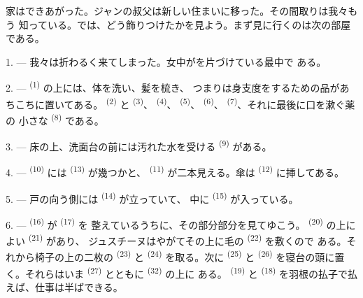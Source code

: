 %

\VUsaut{6.0mm}
\VUsaut{1.4mm}
\VUsaut{0.4mm}
\VUsaut{2.2mm}

家はできあがった。ジャンの叔父は新しい住まいに移った。その間取りは我々もう
知っている。では、どう飾りつけたかを見よう。まず見に行くのは次の部屋である。

\VUsaut{3.0mm}

1. --- 我々は折わるく来てしまった。女中がを片づけている最中で
ある。

2. ---  \textsuperscript{(1)} の上には、体を洗い、髪を梳き、
つまりは身支度をするための品があちこちに置いてある。
\textsuperscript{(2)} と \textsuperscript{(3)}、
\textsuperscript{(4)}、 \textsuperscript{(5)}、
\textsuperscript{(6)}、 \textsuperscript{(7)}、それに最後に口を漱ぐ薬の
小さな \textsuperscript{(8)} である。

3. --- 床の上、洗面台の前には汚れた水を受ける \textsuperscript{(9)}
がある。

4. ---  \textsuperscript{(10)} には \textsuperscript{(13)}
が幾つかと、 \textsuperscript{(11)} が二本見える。傘は
\textsuperscript{(12)} に挿してある。

5. --- 戸の向う側には \textsuperscript{(14)} が立っていて、
中に \textsuperscript{(15)} が入っている。

6. ---  \textsuperscript{(16)} が \textsuperscript{(17)} を
整えているうちに、その部分部分を見てゆこう。
\textsuperscript{(20)} の上によい \textsuperscript{(21)} があり、
ジュスチーヌはやがてその上に毛の \textsuperscript{(22)} を敷くので
ある。それから椅子の上の二枚の \textsuperscript{(23)} と
 \textsuperscript{(24)} を取る。次に \textsuperscript{(25)}
と \textsuperscript{(26)} を寝台の頭に置く。それらはいま
\textsuperscript{(27)} とともに \textsuperscript{(32)} の上に
ある。 \textsuperscript{(19)} と \textsuperscript{(18)}
を羽根の払子で払えば、仕事は半ばできる。

